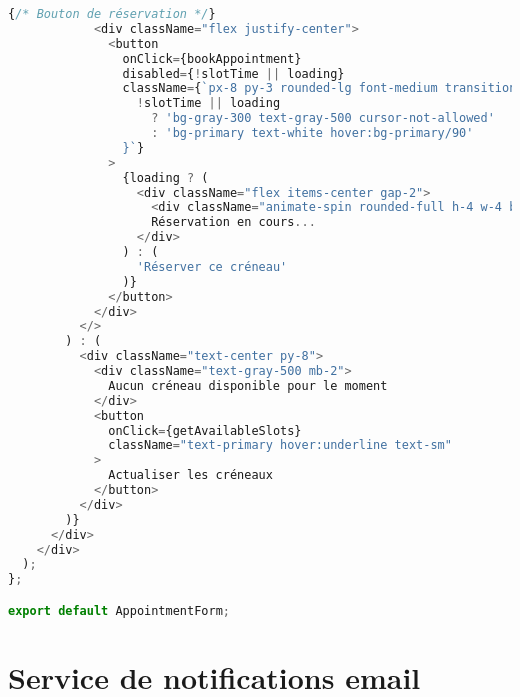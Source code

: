\begin{lstlisting}[language=JavaScript, caption=AppointmentForm.jsx - Formulaire de réservation avec validation]
            {/* Bouton de réservation */}
            <div className="flex justify-center">
              <button
                onClick={bookAppointment}
                disabled={!slotTime || loading}
                className={`px-8 py-3 rounded-lg font-medium transition-all ${
                  !slotTime || loading
                    ? 'bg-gray-300 text-gray-500 cursor-not-allowed'
                    : 'bg-primary text-white hover:bg-primary/90'
                }`}
              >
                {loading ? (
                  <div className="flex items-center gap-2">
                    <div className="animate-spin rounded-full h-4 w-4 border-b-2 border-white"></div>
                    Réservation en cours...
                  </div>
                ) : (
                  'Réserver ce créneau'
                )}
              </button>
            </div>
          </>
        ) : (
          <div className="text-center py-8">
            <div className="text-gray-500 mb-2">
              Aucun créneau disponible pour le moment
            </div>
            <button
              onClick={getAvailableSlots}
              className="text-primary hover:underline text-sm"
            >
              Actualiser les créneaux
            </button>
          </div>
        )}
      </div>
    </div>
  );
};

export default AppointmentForm;
\end{lstlisting}

\section{Service de notifications email}

